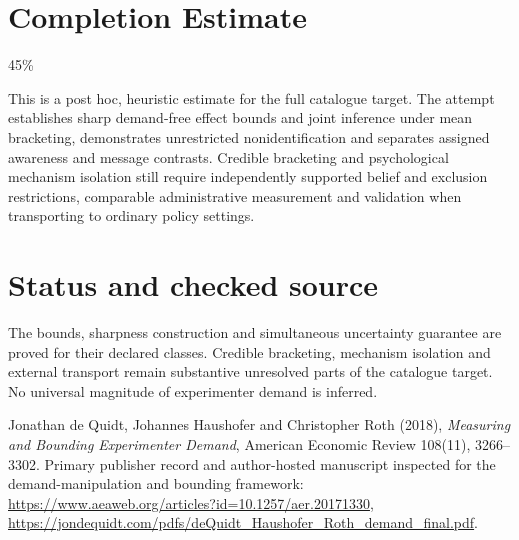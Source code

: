 \documentclass[11pt]{article}
\begin{document}
\section{Completion Estimate}
45\%

This is a post hoc, heuristic estimate for the full catalogue target.
The attempt establishes sharp demand-free effect bounds and joint inference under mean bracketing, demonstrates unrestricted nonidentification and separates assigned awareness and message contrasts. Credible bracketing and psychological mechanism isolation still require independently supported belief and exclusion restrictions, comparable administrative measurement and validation when transporting to ordinary policy settings.

\section{Status and checked source}
The bounds, sharpness construction and simultaneous uncertainty guarantee are proved for their declared classes. Credible bracketing, mechanism isolation and external transport remain substantive unresolved parts of the catalogue target. No universal magnitude of experimenter demand is inferred.

Jonathan de Quidt, Johannes Haushofer and Christopher Roth (2018), \emph{Measuring and Bounding Experimenter Demand}, American Economic Review 108(11), 3266--3302. Primary publisher record and author-hosted manuscript inspected for the demand-manipulation and bounding framework:
\url{https://www.aeaweb.org/articles?id=10.1257/aer.20171330},
\url{https://jondequidt.com/pdfs/deQuidt_Haushofer_Roth_demand_final.pdf}.
\end{document}
